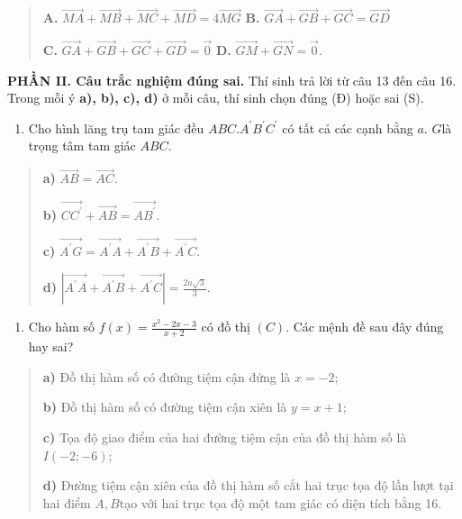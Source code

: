 \documentclass[12pt,a4paper]{article}
\begin{document}
\begin{quote}
\textbf{A.}
\(\overrightarrow{MA} + \overrightarrow{MB} + \overrightarrow{MC} + \overrightarrow{MD} = 4\overrightarrow{MG}\)
\textbf{B.}
\(\overrightarrow{GA} + \overrightarrow{GB} + \overrightarrow{GC} = \overrightarrow{GD}\)

\textbf{C.}
\(\overrightarrow{GA} + \overrightarrow{GB} + \overrightarrow{GC} + \overrightarrow{GD} = \overrightarrow{0}\)
\textbf{D.}
\(\overrightarrow{GM} + \overrightarrow{GN} = \overrightarrow{0}\).
\end{quote}

\textbf{PHẦN II. Câu trắc nghiệm đúng sai.} Thí sinh trả lời từ câu 13
đến câu 16. Trong mỗi ý \textbf{a), b), c), d)} ở mỗi câu, thí sinh chọn
đúng (Đ) hoặc sai (S).

\begin{enumerate}
\def\labelenumi{\arabic{enumi}.}
\setcounter{enumi}{12}
\item
  Cho hình lăng trụ tam giác đều \(ABC.A^{'}B^{'}C^{'}\) có tất cả các
  cạnh bằng \(a\). \(G\)là trọng tâm tam giác \(ABC\).
\end{enumerate}

\begin{quote}
\textbf{a)} \(\overrightarrow{AB} = \overrightarrow{AC}\).

\textbf{b)}
\(\overrightarrow{CC^{'}} + \overrightarrow{AB} = \overrightarrow{AB^{'}}\).

\textbf{c)}
\(\overrightarrow{A^{'}G} = \overrightarrow{A^{'}A} + \overrightarrow{A^{'}B} + \overrightarrow{A^{'}C}\).

\textbf{d)}
\(\left| \overrightarrow{A^{'}A} + \overrightarrow{A^{'}B} + \overrightarrow{A^{'}C} \right| = \frac{2a\sqrt{3}}{3}\).
\end{quote}

\begin{enumerate}
\def\labelenumi{\arabic{enumi}.}
\setcounter{enumi}{13}
\item
  Cho hàm số \(f(x) = \frac{x^{2} - 2x - 3}{x + 2}\) có đồ thị \((C)\).
  Các mệnh đề sau đây đúng hay sai?
\end{enumerate}

\begin{quote}
\textbf{a)} Đồ thị hàm số có đường tiệm cận đứng là \(x = - 2\);

\textbf{b)} Đồ thị hàm số có đường tiệm cận xiên là \(y = x + 1\);

\textbf{c)} Tọa độ giao điểm của hai đường tiệm cận của đồ thị hàm số là
\(I( - 2; - 6)\);

\textbf{d)} Đường tiệm cận xiên của đồ thị hàm số cắt hai trục tọa độ
lần lượt tại hai điểm \(A,B\)tạo với hai trục tọa độ một tam giác có
diện tích bằng 16.
\end{quote}
\end{document}
